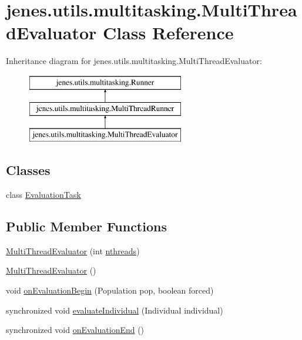 \hypertarget{classjenes_1_1utils_1_1multitasking_1_1_multi_thread_evaluator}{\section{jenes.\-utils.\-multitasking.\-Multi\-Thread\-Evaluator Class Reference}
\label{classjenes_1_1utils_1_1multitasking_1_1_multi_thread_evaluator}
}
Inheritance diagram for jenes.\-utils.\-multitasking.\-Multi\-Thread\-Evaluator\-:\begin{figure}[H]
\begin{center}
\leavevmode
\includegraphics[height=3.000000cm]{classjenes_1_1utils_1_1multitasking_1_1_multi_thread_evaluator}
\end{center}
\end{figure}
\subsection*{Classes}
\begin{DoxyCompactItemize}
\item 
class \hyperlink{classjenes_1_1utils_1_1multitasking_1_1_multi_thread_evaluator_1_1_evaluation_task}{Evaluation\-Task}
\end{DoxyCompactItemize}
\subsection*{Public Member Functions}
\begin{DoxyCompactItemize}
\item 
\hyperlink{classjenes_1_1utils_1_1multitasking_1_1_multi_thread_evaluator_a842d648ae03a8d7f835a24c522d229ae}{Multi\-Thread\-Evaluator} (int \hyperlink{classjenes_1_1utils_1_1multitasking_1_1_multi_thread_runner_aa20fe700a6b2abd3694b4a1d5629db8f}{nthreads})
\item 
\hyperlink{classjenes_1_1utils_1_1multitasking_1_1_multi_thread_evaluator_ac9949bf8de0efb0cb47feb2df56140ff}{Multi\-Thread\-Evaluator} ()
\item 
void \hyperlink{classjenes_1_1utils_1_1multitasking_1_1_multi_thread_evaluator_a2a9d9427ca8c2b8a9dfc541c85bada42}{on\-Evaluation\-Begin} (Population pop, boolean forced)
\item 
synchronized void \hyperlink{classjenes_1_1utils_1_1multitasking_1_1_multi_thread_evaluator_ad99c13b137f1089a9f30377548b42e25}{evaluate\-Individual} (Individual individual)
\item 
synchronized void \hyperlink{classjenes_1_1utils_1_1multitasking_1_1_multi_thread_evaluator_a3cd56b43989da43e4b3c2b79260d5f5f}{on\-Evaluation\-End} ()
\end{DoxyCompactItemize}
